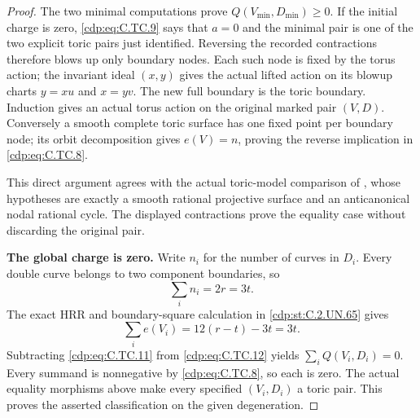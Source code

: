 \begin{proof}
The two minimal computations prove
$Q(V_{\min},D_{\min})\ge0$.
If the initial charge is zero,
\eqref{cdp:eq:C.TC.9} says that $a=0$ and
the minimal pair is one of the
two explicit toric pairs just
identified. Reversing the recorded
contractions therefore blows up
only boundary nodes. Each such
node is fixed by the torus action;
the invariant ideal $(x,y)$ gives
the actual lifted action on its
blowup charts $y=xu$ and $x=yv$.
The new full boundary is the
toric boundary. Induction gives
an actual torus action on the
original marked pair $(V,D)$.
Conversely a smooth complete
toric surface has one fixed
point per boundary node; its
orbit decomposition gives
$e(V)=n$, proving the reverse
implication in \eqref{cdp:eq:C.TC.8}.

This direct argument agrees with
the actual toric-model comparison
of \cite[Definition 1.2 and Proposition 1.3]{GHK2015},
whose hypotheses are exactly a
smooth rational projective surface
and an anticanonical nodal rational
cycle. The displayed contractions
prove the equality case without
discarding the original pair.

\par\medskip\noindent\textbf{The global charge is zero.}
Write $n_i$ for the number of
curves in $D_i$. Every double
curve belongs to two component
boundaries, so
\[
                         \sum_i n_i=2r=3t.
\tag{C.TC.11}\label{cdp:eq:C.TC.11}
\]
The exact HRR and boundary-square
calculation in \ref{cdp:st:C.2.UN.65} gives
\[
            \sum_i e(V_i)
             =12(r-t)-3t=3t.
\tag{C.TC.12}\label{cdp:eq:C.TC.12}
\]
Subtracting \eqref{cdp:eq:C.TC.11} from
\eqref{cdp:eq:C.TC.12} yields
$\sum_i Q(V_i,D_i)=0$.
Every summand is nonnegative by
\eqref{cdp:eq:C.TC.8}, so each is zero.
The actual equality morphisms
above make every specified
$(V_i,D_i)$ a toric pair.
This proves the asserted
classification on the given
degeneration.
\end{proof}


